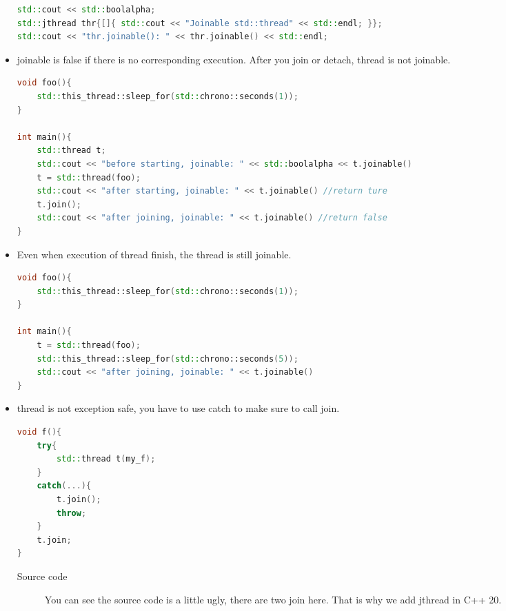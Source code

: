\documentclass[a4paper,11pt,twoside]{book}
\begin{document}
\begin{itemize}
\begin{lstlisting}[frame=single, language=c++]
std::cout << std::boolalpha;
std::jthread thr{[]{ std::cout << "Joinable std::thread" << std::endl; }};
std::cout << "thr.joinable(): " << thr.joinable() << std::endl;	
\end{lstlisting}
	
	\item joinable is false if there is no corresponding execution. After you join or detach, thread is not joinable.

\begin{lstlisting}[frame=single, language=c++]
void foo(){
	std::this_thread::sleep_for(std::chrono::seconds(1));
}

int main(){
	std::thread t;
	std::cout << "before starting, joinable: " << std::boolalpha << t.joinable()
	t = std::thread(foo);
	std::cout << "after starting, joinable: " << t.joinable() //return ture 
	t.join();
	std::cout << "after joining, joinable: " << t.joinable() //return false
}
\end{lstlisting}


\item Even when execution of thread finish, the thread is still joinable.  

\begin{lstlisting}[frame=single, language=c++]
void foo(){
	std::this_thread::sleep_for(std::chrono::seconds(1));
}

int main(){
	t = std::thread(foo);
	std::this_thread::sleep_for(std::chrono::seconds(5));
	std::cout << "after joining, joinable: " << t.joinable() 
}
\end{lstlisting}

\item thread is not exception safe, you have to use catch to make sure to call join.

\begin{lstlisting}[frame=single, language=c++]
void f(){
	try{
		std::thread t(my_f);
	}
	catch(...){
		t.join();
		throw;
	}
	t.join;
}
\end{lstlisting}

\begin{description}
	\item[Source code] You can see the source code is a little ugly, there are two join here. That is why we add jthread in C++ 20.
\end{description}


\end{itemize}
\end{document}
